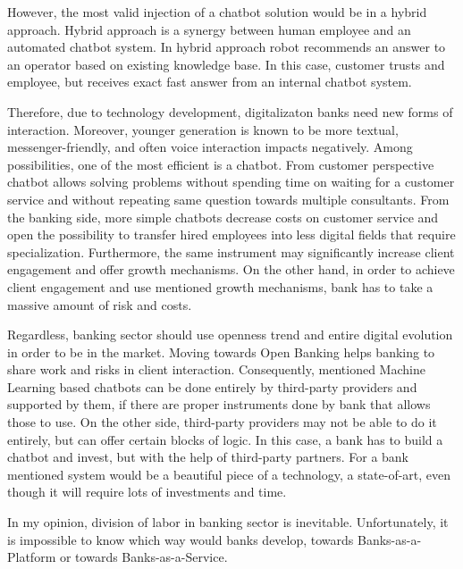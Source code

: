However, the most valid injection of a chatbot solution would be in a hybrid approach.
Hybrid approach is a synergy between human employee and an automated chatbot system.
In hybrid approach robot recommends an answer to an operator based on existing knowledge base.
In this case, customer trusts and employee, but receives exact fast answer from an internal chatbot system.

Therefore, due to technology development, digitalizaton banks need new forms of interaction.
Moreover, younger generation is known to be more textual, messenger-friendly, and often voice interaction impacts negatively.
Among possibilities, one of the most efficient is a chatbot.
From customer perspective chatbot allows solving problems without spending time on waiting for a customer service and without repeating same question towards multiple consultants.
From the banking side, more simple chatbots decrease costs on customer service and open the possibility to transfer hired employees into less digital fields that require specialization.
Furthermore, the same instrument may significantly increase client engagement and offer growth mechanisms.
On the other hand, in order to achieve client engagement and use mentioned growth mechanisms, bank has to take a massive amount of risk and costs.

Regardless, banking sector should use openness trend and entire digital evolution in order to be in the market.
Moving towards Open Banking helps banking to share work and risks in client interaction.
Consequently, mentioned Machine Learning based chatbots can be done entirely by third-party providers and supported by them, if there are proper instruments done by bank that allows those to use.
On the other side, third-party providers may not be able to do it entirely, but can offer certain blocks of logic.
In this case, a bank has to build a chatbot and invest, but with the help of third-party partners.
For a bank mentioned system would be a beautiful piece of a technology, a state-of-art, even though it will require lots of investments and time.

In my opinion, division of labor in banking sector is inevitable.
Unfortunately, it is impossible to know which way would banks develop, towards Banks-as-a-Platform or towards Banks-as-a-Service.

